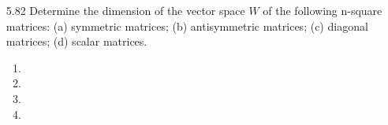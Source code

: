 \documentclass[12pt]{article}
\begin{document}
\begin{enumerate}
\item[5.82] Determine the dimension of the vector space $W$ of the following n-square matrices: (a) symmetric matrices; (b) antisymmetric matrices; (c) diagonal matrices; (d) scalar matrices.
	\begin{enumerate}
	\item
	\item
	\item
	\item
	\end{enumerate}
\end{enumerate}
\end{document}
